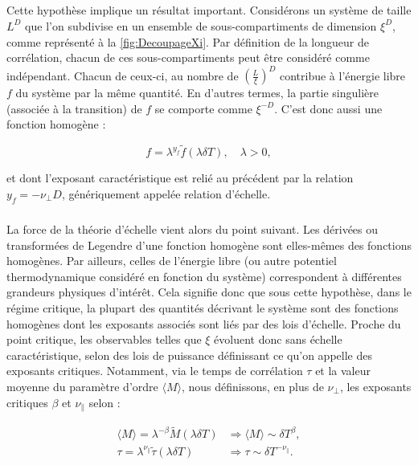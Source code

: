\subparagraph{}Cette hypothèse implique un résultat important. Considérons un système de taille $L^D$ que l'on subdivise en un ensemble de sous-compartiments de dimension $\xi^D$, comme représenté à la \autoref{fig:DecoupageXi}. Par définition de la longueur de corrélation, chacun de ces sous-compartiments peut être considéré comme indépendant. Chacun de ceux-ci, au nombre de $\left(\frac{L}{\xi}\right)^D$ contribue à l'énergie libre $f$ du système par la même quantité. En d'autres termes, la partie singulière (associée à la transition) de $f$ se comporte comme $\xi^{-D}$. C'est donc aussi une fonction homogène :

\begin{equation}
    f = \lambda^{y_f}\tilde{f}(\lambda \delta T), \quad \lambda > 0,
\end{equation}

\noindent et dont l'exposant caractéristique est relié au précédent par la relation $y_f = - \nu_\perp D$, génériquement appelée relation d'échelle. 

\subparagraph{}La force de la théorie d'échelle vient alors du point suivant. Les dérivées ou transformées de Legendre d'une fonction homogène sont elles-mêmes des fonctions homogènes. Par ailleurs, celles de l'énergie libre (ou autre potentiel thermodynamique considéré en fonction du système) correspondent à différentes grandeurs physiques d'intérêt. Cela signifie donc que sous cette hypothèse, dans le régime critique, la plupart des quantités décrivant le système sont des fonctions homogènes dont les exposants associés sont liés par des lois d'échelle. Proche du point critique, les observables telles que $\xi$ évoluent donc sans échelle caractéristique, selon des lois de puissance définissant ce qu'on appelle des exposants critiques. Notamment, via le temps de corrélation $\tau$ et la valeur moyenne du paramètre d'ordre $\langle M \rangle$, nous définissons, en plus de $\nu_\perp$, les exposants critiques $\beta$ et $\nu_\parallel$ selon :

\begin{equation}
\begin{aligned}
	\langle M \rangle = \lambda^{-\beta} \tilde{M}(\lambda \delta T) &\Rightarrow \langle M \rangle  \sim \delta T^{\beta},\\
	\tau = \lambda^{\nu_\parallel} \tilde{\tau}(\lambda \delta T) &\Rightarrow \tau \sim \delta T^{-\nu_\parallel}.
\end{aligned}
\end{equation}

